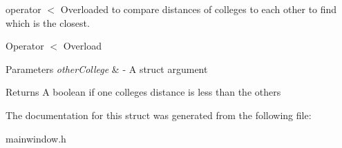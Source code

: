 operator $<$ Overloaded to compare distances of colleges to each other to find which is the closest. 

Operator $<$ Overload 
\begin{DoxyParams}{Parameters}
{\em other\+College} & -\/ A struct argument \\
\hline
\end{DoxyParams}
\begin{DoxyReturn}{Returns}
A boolean if one college\textquotesingle{}s distance is less than the others 
\end{DoxyReturn}


The documentation for this struct was generated from the following file\+:\begin{DoxyCompactItemize}
\item 
mainwindow.\+h\end{DoxyCompactItemize}
